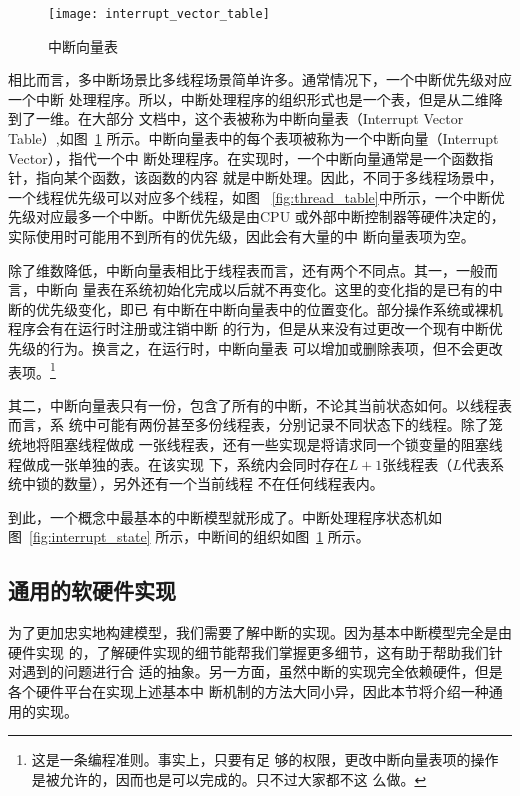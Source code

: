 \begin{figure}[H]
	\centering
	\texttt{[image: interrupt\_vector\_table]}
	\caption{中断向量表}
	\label{fig:interrupt_vector_table}
\end{figure}

相比而言，多中断场景比多线程场景简单许多。通常情况下，一个中断优先级对应一个中断
处理程序。所以，中断处理程序的组织形式也是一个表，但是从二维降到了一维。在大部分
文档中，这个表被称为中断向量表（Interrupt Vector Table）,如图~\ref{fig:interrupt_vector_table} 
所示。中断向量表中的每个表项被称为一个中断向量（Interrupt Vector），指代一个中
断处理程序。在实现时，一个中断向量通常是一个函数指针，指向某个函数，该函数的内容
就是中断处理。因此，不同于多线程场景中，一个线程优先级可以对应多个线程，如图~
\ref{fig:thread_table}中所示，一个中断优先级对应最多一个中断。中断优先级是由CPU
或外部中断控制器等硬件决定的，实际使用时可能用不到所有的优先级，因此会有大量的中
断向量表项为空。

除了维数降低，中断向量表相比于线程表而言，还有两个不同点。其一，一般而言，中断向
量表在系统初始化完成以后就不再变化。这里的变化指的是已有的中断的优先级变化，即已
有中断在中断向量表中的位置变化。部分操作系统或裸机程序会有在运行时注册或注销中断
的行为，但是从来没有过更改一个现有中断优先级的行为。换言之，在运行时，中断向量表
可以增加或删除表项，但不会更改表项。\footnote{这是一条编程准则。事实上，只要有足
够的权限，更改中断向量表项的操作是被允许的，因而也是可以完成的。只不过大家都不这
么做。}

其二，中断向量表只有一份，包含了所有的中断，不论其当前状态如何。以线程表而言，系
统中可能有两份甚至多份线程表，分别记录不同状态下的线程。除了笼统地将阻塞线程做成
一张线程表，还有一些实现是将请求同一个锁变量的阻塞线程做成一张单独的表。在该实现
下，系统内会同时存在$L+1$张线程表（$L$代表系统中锁的数量），另外还有一个当前线程
不在任何线程表内。

到此，一个概念中最基本的中断模型就形成了。中断处理程序状态机如图~\ref{fig:interrupt_state} 
所示，中断间的组织如图~\ref{fig:interrupt_vector_table} 所示。

\subsection{通用的软硬件实现}
\label{subsec:basic_hardware}

为了更加忠实地构建模型，我们需要了解中断的实现。因为基本中断模型完全是由硬件实现
的，了解硬件实现的细节能帮我们掌握更多细节，这有助于帮助我们针对遇到的问题进行合
适的抽象。另一方面，虽然中断的实现完全依赖硬件，但是各个硬件平台在实现上述基本中
断机制的方法大同小异，因此本节将介绍一种通用的实现。

